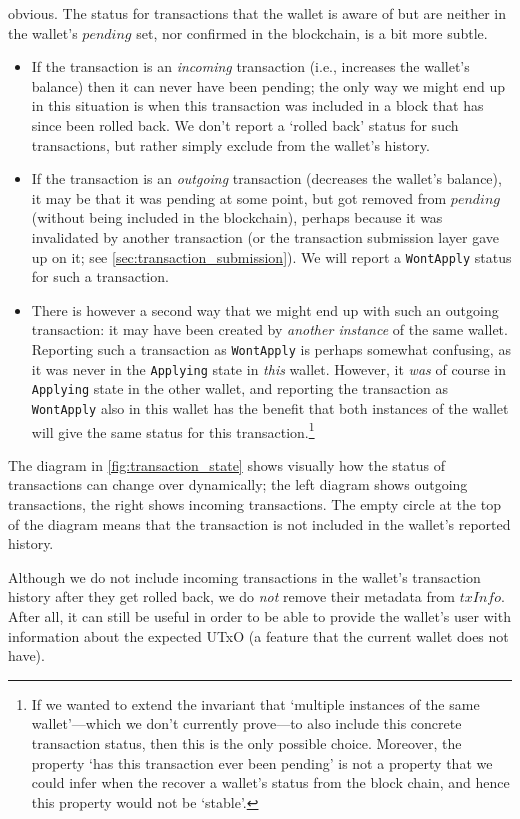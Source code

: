 \documentclass{article}
\theoremstyle{definition}{
  \newtheorem{lemma}{Lemma}[section] %
  \newtheorem{definition}[lemma]{Definition}
}
\theoremstyle{theorem}{
  \newtheorem{invariant}[lemma]{Invariant}
  \newtheorem{proofobligation}[lemma]{Proof Obligation}
}
\numberwithin{equation}{lemma}
\begin{document}
obvious. The status for transactions that the wallet is aware of but
are neither in the wallet's $\mathit{pending}$ set, nor confirmed in the
blockchain, is a bit more subtle.
%
\begin{itemize}
\item If the transaction is an \emph{incoming} transaction (i.e., increases
the wallet's balance) then it can never have been pending; the only way we might
end up in this situation is when this transaction was included in a block that
has since been rolled back. We don't report a `rolled back' status for such
transactions, but rather simply exclude from the wallet's history.
\item If the transaction is an \emph{outgoing} transaction (decreases the
wallet's balance), it may be that it was pending at some point, but got removed
from $\mathit{pending}$ (without being included in the blockchain), perhaps
because it was invalidated by another transaction (or the transaction submission
layer gave up on it; see \cref{sec:transaction_submission}). We will
report a \texttt{WontApply} status for such a transaction.
\item There is however a second way that we might end up with such an
outgoing transaction: it may have been created by \emph{another instance} of the
same wallet. Reporting such a transaction as \texttt{WontApply} is perhaps
somewhat confusing, as it was never in the \texttt{Applying} state in
\emph{this} wallet. However, it \emph{was} of course in \texttt{Applying} state
in the other wallet, and reporting the transaction as \texttt{WontApply} also in
this wallet has the benefit that both instances of the wallet will give the same
status for this transaction.\footnote{If we wanted to extend the invariant that
`multiple instances of the same wallet'---which we don't currently prove---to
also include this concrete transaction status, then this is the only possible
choice. Moreover, the property `has this transaction ever been pending' is not
a property that we could infer when the recover a wallet's status from the block
chain, and hence this property would not be `stable'.}
\end{itemize}
%
The diagram in \cref{fig:transaction_state} shows visually how the status of
transactions can change over dynamically; the left diagram shows outgoing
transactions, the right shows incoming transactions. The empty circle at the top
of the diagram means that the transaction is not included in the wallet's
reported history.

Although we do not include incoming transactions in the wallet's transaction
history after they get rolled back, we do \emph{not} remove their metadata  from
$\mathit{txInfo}$. After all, it can still be useful in order to be able to
provide the wallet's user with information about the expected UTxO (a feature
that the current wallet does not have).
\end{document}
